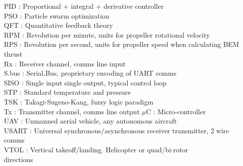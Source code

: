 \documentclass[a4paper, 11pt, oneside, openright, parskip=full]{book}
\begin{document}
PID : Proportional + integral + derivative controller\\
PSO : Particle swarm optimization\\
QFT : Quantitative feedback theory\\
RPM : Revolution per minute, units for propeller rotational 
velocity\\
RPS : Revolution per second, units for propeller speed when calculating BEM thrust\\
Rx : Receiver channel, comms line input\\
S.bus : Serial.Bus, proprietary encoding of UART comms\\
SISO : Single input single output, typical control loop\\
STP : Standard temperature and pressure\\
TSK : Takagi-Sugeno-Kang, fuzzy logic paradigm\\
Tx : Transmitter channel, comms line output
$\mu$C : Micro-controller\\
UAV : Unmanned aerial vehicle, any autonomous aircraft\\
USART : Universal synchronous/asynchronous receiver transmitter, 2 wire comms\\
VTOL : Vertical takeoff/landing. Helicopter or quad/bi-rotor\\
 directions\\
\end{document}
